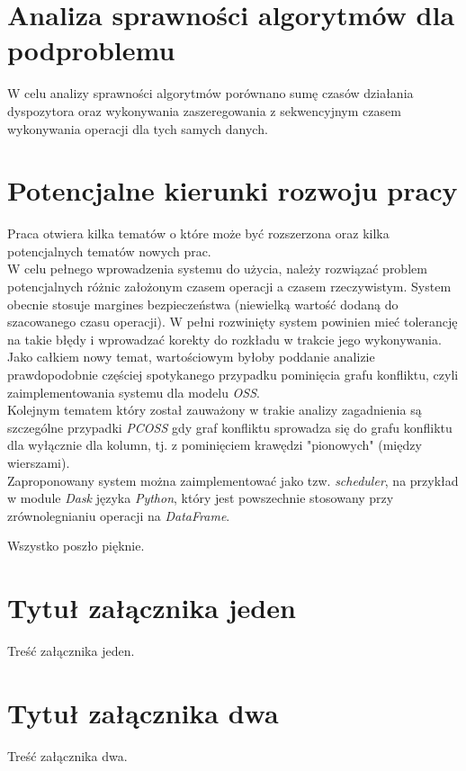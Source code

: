 \documentclass[brudnopis]{xmgr}
\begin{document}
\chapter{Analiza sprawności algorytmów dla podproblemu}

W celu analizy sprawności algorytmów porównano sumę czasów działania dyspozytora oraz wykonywania zaszeregowania z sekwencyjnym czasem wykonywania operacji dla tych samych danych.

\chapter{Potencjalne kierunki rozwoju pracy} \label{chap:extend}

Praca otwiera kilka tematów o które może być rozszerzona oraz kilka potencjalnych tematów nowych prac.
\medskip\\

W celu pełnego wprowadzenia systemu do użycia, należy rozwiązać problem potencjalnych różnic założonym czasem operacji a czasem rzeczywistym. System obecnie stosuje margines bezpieczeństwa (niewielką wartość dodaną do szacowanego czasu operacji).
W pełni rozwinięty system powinien mieć tolerancję na takie błędy i wprowadzać korekty do rozkładu w trakcie jego wykonywania.
\medskip\\

Jako całkiem nowy temat, wartościowym byłoby poddanie analizie prawdopodobnie częściej spotykanego przypadku pominięcia grafu konfliktu, czyli zaimplementowania systemu dla modelu \emph{OSS}.
\medskip\\

Kolejnym tematem który został zauważony w trakie analizy zagadnienia są szczególne przypadki \emph{PCOSS} gdy graf konfliktu sprowadza się do grafu konfliktu dla wyłącznie dla kolumn, tj. z pominięciem krawędzi "pionowych" (między wierszami).
\medskip\\

Zaproponowany system można zaimplementować jako tzw. \emph{scheduler}, na przykład w module \emph{Dask} języka \emph{Python}, który jest powszechnie stosowany przy zrównolegnianiu operacji na \emph{DataFrame}.

\summary

Wszystko poszło pięknie.

\appendix
\chapter{Tytuł załącznika jeden}

Treść załącznika jeden.

\chapter{Tytuł załącznika dwa}

Treść załącznika dwa.




\listoftables

\listoffigures

\oswiadczenie
\end{document}
